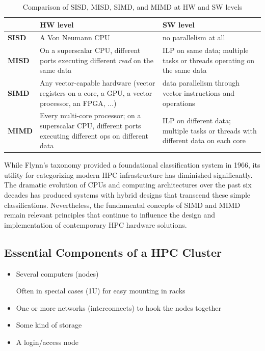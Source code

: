 \begin{table}[ht]
    \centering
    \begin{tabular}{l p{6.8cm} p{6.8cm}}
        \hline
        \textbf{} & \textbf{HW level} & \textbf{SW level} \\
        \hline
        \textbf{SISD} & 
        A Von Neumann CPU & 
        no parallelism at all \\
        \hline
        \textbf{MISD} & 
        On a superscalar CPU, different ports executing different \textit{read} on the same data & 
        ILP on same data; multiple tasks or threads operating on the same data \\
        \hline
        \textbf{SIMD} & 
        Any vector-capable hardware (vector registers on a core, a GPU, a vector processor, an FPGA, ...) & 
        data parallelism through vector instructions and operations \\
        \hline
        \textbf{MIMD} & 
        Every multi-core processor; on a superscalar CPU, different ports executing different ops on different data & 
        ILP on different data; multiple tasks or threads with different data on each core \\
        \hline
    \end{tabular}
    \caption{Comparison of SISD, MISD, SIMD, and MIMD at HW and SW levels}
    \label{tab:hw-sw-comparison}
\end{table}

While Flynn's taxonomy provided a foundational classification system in 1966, its utility for categorizing modern HPC infrastructure has diminished significantly. The dramatic evolution of CPUs and computing architectures over the past six decades has produced systems with hybrid designs that transcend these simple classifications. Nevertheless, the fundamental concepts of SIMD and MIMD remain relevant principles that continue to influence the design and implementation of contemporary HPC hardware solutions.

\subsection{Essential Components of a HPC Cluster}

\begin{itemize}
    \item Several computers (nodes)
        
        Often in special cases (1U) for easy mounting in racks

    \item One or more networks (interconnects) to hook the nodes together
    \item Some kind of storage
    \item A login/access node
\end{itemize}


